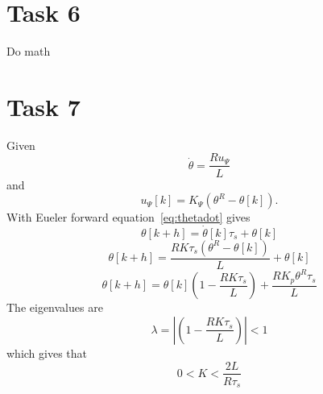 \documentclass[a4paper,12pt,oneside,onecolumn]{article} %
\begin{document}
\section*{Task 6}

Do math

\section*{Task 7}
 	Given
	\begin{equation}
		\dot{\theta} = \frac{Ru_\Psi}{L}
		 \label{eq:thetadot}
	\end{equation}
	and
	\begin{equation}
		u_\Psi{[k]} = K_{\Psi}({\theta}^R  - {\theta}[k]).
	\end{equation}
	With Eueler forward equation~\ref{eq:thetadot} gives
	\begin{equation}
		\theta[k+h] = \dot{\theta}[k]\tau_s + \theta[k]
	\end{equation}
	\begin{equation}
		\theta[k+h] = \frac{RK\tau_s({\theta}^R  - {\theta}[k])}{L} + \theta[k]
	\end{equation}
	\begin{equation}
		\theta[k+h] =\theta[k](1-\frac{RK\tau_s}{L}) + \frac{RK_p\theta^R\tau_s}{L}
	\end{equation}
The eigenvalues are
	\begin{equation}
		\lambda = \left|{(1-\frac{RK\tau_s}{L})}\right| < 1
	\end{equation}
	which gives that 
	\begin{equation}
		0 < K < \frac{2L}{R\tau_s}
	\end{equation}
\end{document}
